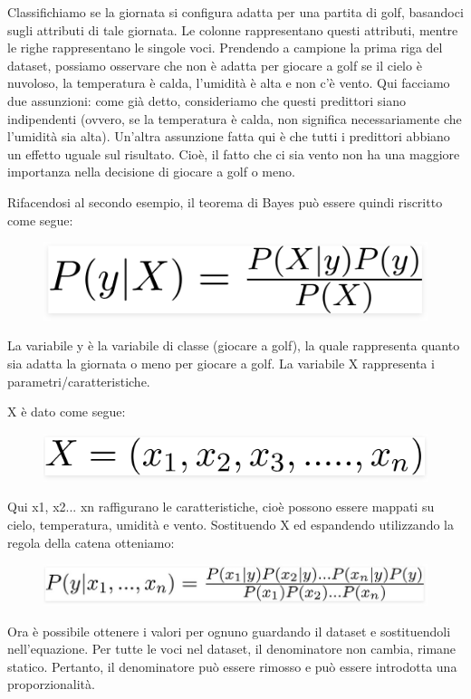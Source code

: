 Classifichiamo se la giornata si configura adatta per una partita di golf, basandoci sugli attributi di tale giornata. Le colonne rappresentano questi attributi, mentre le righe rappresentano le singole voci.
Prendendo a campione la prima riga del dataset, possiamo osservare che non è adatta per giocare a golf se il cielo è nuvoloso, la temperatura è calda, l'umidità è alta e non c'è vento. Qui facciamo due assunzioni: 
come già detto, consideriamo che questi predittori siano indipendenti (ovvero, se la temperatura è calda, non significa necessariamente che l'umidità sia alta). Un'altra assunzione fatta qui è che tutti i predittori abbiano un eﬀetto uguale sul risultato. Cioè, il fatto che ci sia vento non ha una maggiore importanza nella  decisione di giocare a golf o meno. 


Rifacendosi al secondo esempio, il teorema di Bayes può essere quindi riscritto come segue:

\begin{figure}
    \begin{center}    
        \includegraphics[width=0.9\linewidth]{images/image19.png}
    \end{center}
\end{figure}
La variabile y è la variabile di classe (giocare a golf), la quale rappresenta quanto sia adatta la giornata o meno per giocare a golf. La variabile X rappresenta i parametri/caratteristiche.


X è dato come segue:
\begin{figure}
    \begin{center}    
        \includegraphics[width=0.9\linewidth]{images/image20.png}
    \end{center}
\end{figure}
Qui x1, x2... xn raffigurano le caratteristiche, cioè possono essere mappati su cielo, temperatura, umidità e vento. Sostituendo X ed espandendo utilizzando la regola della catena otteniamo:
\begin{figure}
    \begin{center}    
        \includegraphics[width=0.9\linewidth]{images/image21.jpeg}
    \end{center}
\end{figure}
Ora è possibile ottenere i valori per ognuno guardando il dataset e sostituendoli nell'equazione. Per tutte le voci nel dataset, il denominatore non cambia, rimane statico. Pertanto, il denominatore può essere rimosso e può essere introdotta una proporzionalità.

